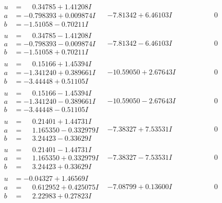\documentclass[1p]{elsarticle_modified}
\theoremstyle{definition}
\begin{document}
$$\begin{array}{c|c|c}
\begin{aligned}
u &= \phantom{-}0.34785 + 1.41208 I \\
a &= -0.798393 + 0.009874 I \\
b &= -1.51058 - 0.70211 I\end{aligned}
 & -7.81342 + 6.46103 I & \phantom{-0.000000 } 0 \\ \hline\begin{aligned}
u &= \phantom{-}0.34785 - 1.41208 I \\
a &= -0.798393 - 0.009874 I \\
b &= -1.51058 + 0.70211 I\end{aligned}
 & -7.81342 - 6.46103 I & \phantom{-0.000000 } 0 \\ \hline\begin{aligned}
u &= \phantom{-}0.15166 + 1.45394 I \\
a &= -1.341240 + 0.389661 I \\
b &= -3.44448 + 0.51105 I\end{aligned}
 & -10.59050 + 2.67643 I & \phantom{-0.000000 } 0 \\ \hline\begin{aligned}
u &= \phantom{-}0.15166 - 1.45394 I \\
a &= -1.341240 - 0.389661 I \\
b &= -3.44448 - 0.51105 I\end{aligned}
 & -10.59050 - 2.67643 I & \phantom{-0.000000 } 0 \\ \hline\begin{aligned}
u &= \phantom{-}0.21401 + 1.44731 I \\
a &= \phantom{-}1.165350 - 0.332979 I \\
b &= \phantom{-}3.24423 - 0.33629 I\end{aligned}
 & -7.38327 + 7.53531 I & \phantom{-0.000000 } 0 \\ \hline\begin{aligned}
u &= \phantom{-}0.21401 - 1.44731 I \\
a &= \phantom{-}1.165350 + 0.332979 I \\
b &= \phantom{-}3.24423 + 0.33629 I\end{aligned}
 & -7.38327 - 7.53531 I & \phantom{-0.000000 } 0 \\ \hline\begin{aligned}
u &= -0.04327 + 1.46569 I \\
a &= \phantom{-}0.612952 + 0.425075 I \\
b &= \phantom{-}2.22983 + 0.27823 I\end{aligned}
 & -7.08799 + 0.13600 I & \phantom{-0.000000 } 0 \\ \hline\begin{aligned}

\end{aligned}
\end{array}$$
\end{document}

